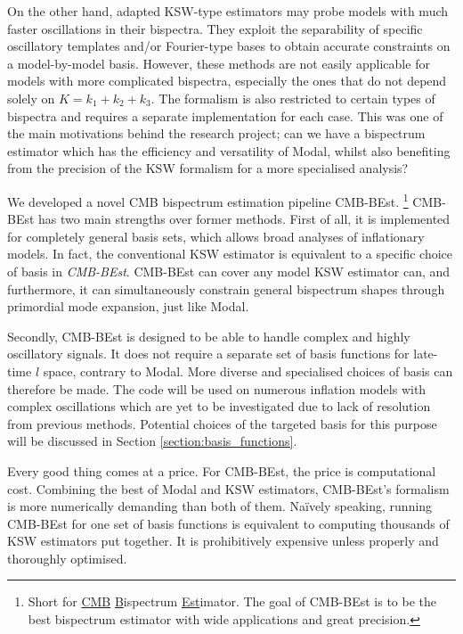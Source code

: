 On the other hand, adapted KSW-type estimators \cite{Munchmeyer2014,Munchmeyer2015resonance,Meerburg2016jointResonance} may probe models with much faster oscillations in their bispectra. They exploit the separability of specific oscillatory templates and/or Fourier-type bases to obtain accurate constraints on a model-by-model basis. However, these methods are not easily applicable for models with more complicated bispectra, especially the ones that do not depend solely on $K=k_1+k_2+k_3$. The formalism is also restricted to certain types of bispectra and requires a separate implementation for each case. This was one of the main motivations behind the research project; can we have a bispectrum estimator which has the efficiency and versatility of Modal, whilst also benefiting from the precision of the KSW formalism for a more specialised analysis?

We developed a novel CMB bispectrum estimation pipeline CMB-BEst. \footnote{Short for \underline{CMB} \underline{B}ispectrum \underline{Est}imator. The goal of CMB-BEst is to be the best bispectrum estimator with wide applications and great precision.} CMB-BEst has two main strengths over former methods. First of all, it is implemented for completely general basis sets, which allows broad analyses of inflationary models. In fact, the conventional KSW estimator is equivalent to a specific choice of basis in \textit{CMB-BEst}. CMB-BEst can cover any model KSW estimator can, and furthermore, it can simultaneously constrain general bispectrum shapes through primordial mode expansion, just like Modal.

Secondly, CMB-BEst is designed to be able to handle complex and highly oscillatory signals. It does not require a separate set of basis functions for late-time $l$ space, contrary to Modal. More diverse and specialised choices of basis can therefore be made. The code will be used on numerous inflation models with complex oscillations which are yet to be investigated due to lack of resolution from previous methods. Potential choices of the targeted basis for this purpose will be discussed in Section \ref{section:basis_functions}.

Every good thing comes at a price. For CMB-BEst, the price is computational cost. Combining the best of Modal and KSW estimators, CMB-BEst's formalism is more numerically demanding than both of them. Na\"ively speaking, running CMB-BEst for one set of basis functions is equivalent to computing thousands of KSW estimators put together. It is prohibitively expensive unless properly and thoroughly optimised.

